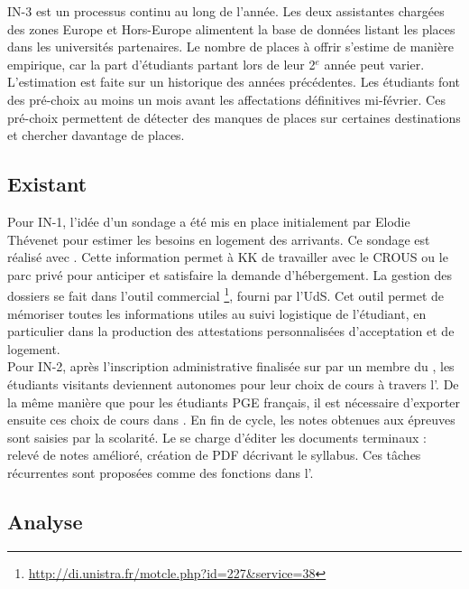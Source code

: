 \documentclass{book}
\begin{document}
IN-3 est un processus continu au long de l'année. Les deux assistantes
chargées des zones Europe et Hors-Europe alimentent la base de données
listant les places dans les universités partenaires. Le nombre de places
à offrir s'estime de manière empirique, car la part d'étudiants partant 
lors de leur 2$^e$ année peut varier. L'estimation est faite sur un 
historique des années précédentes. Les étudiants font des pré-choix
au moins un mois avant les affectations définitives mi-février. Ces 
pré-choix permettent de détecter des manques de places sur certaines
destinations et chercher davantage de places.

\subsection{Existant}

Pour IN-1, l'idée d'un sondage a été mis en place initialement par Elodie 
Thévenet pour estimer les besoins en logement des arrivants. Ce sondage est 
réalisé avec \textit{}. Cette information permet
à KK de travailler avec le CROUS ou le parc privé pour anticiper et satisfaire 
la demande d'hébergement.
La gestion des dossiers se fait dans l'outil commercial \textit{}%
\footnote{\url{http://di.unistra.fr/motcle.php?id=227&service=38}},
fourni par l'UdS. Cet outil permet de mémoriser toutes les informations
utiles au suivi logistique de l'étudiant, en particulier dans la production
des attestations personnalisées d'acceptation et de logement.\\

Pour IN-2, après l'inscription administrative finalisée sur 
par un membre du \sintl, les étudiants visitants deviennent autonomes pour 
leur choix de cours à travers l'. De la même manière
que pour les étudiants PGE français, il est nécessaire d'exporter ensuite
ces choix de cours dans . En fin de cycle, les notes 
obtenues aux épreuves sont saisies par la scolarité. Le \sintl se charge
d'éditer les documents terminaux : relevé de notes amélioré, création
de PDF décrivant le syllabus. Ces tâches récurrentes sont proposées
comme des fonctions dans l'.
 

\subsection{Analyse}
\end{document}
